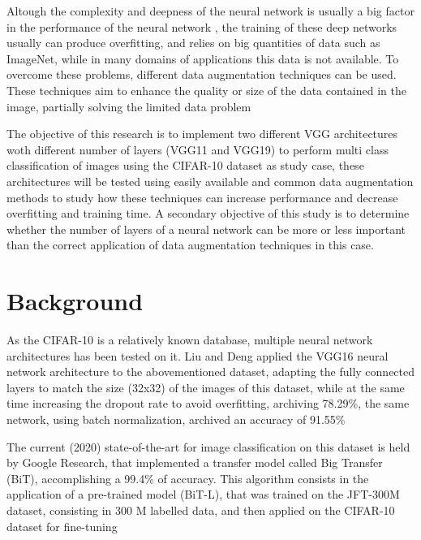 \documentclass[10pt,twocolumn,letterpaper]{article}
\begin{document}
Altough the complexity and deepness of the neural network is usually a big factor in the performance of the neural network \cite{He2016}, the training of these deep networks usually can produce overfitting, and relies on big quantities of data such as ImageNet, while in many domains of applications this data is not available. To overcome these problems, different data augmentation techniques can be used. These techniques aim to enhance the quality or size of the data contained in the image, partially solving the limited data problem \cite{Shorten2019}

The objective of this research is to implement two different VGG architectures woth different number of layers (VGG11 and VGG19) to perform multi class classification of images using the CIFAR-10 dataset as study case, these architectures will be tested using easily available and common data augmentation methods to study how these techniques can increase performance and decrease overfitting and training time. A secondary objective of this study is to determine whether the number of layers of a neural network can be more or less important than the correct application of data augmentation techniques in this case.


\section{Background}

As the CIFAR-10 is a relatively known database, multiple neural network architectures has been tested on it. Liu and Deng \cite{Liu2016} applied the VGG16 neural network architecture to the abovementioned dataset, adapting the fully connected layers to match the size (32x32) of the images of this dataset, while at the same time increasing the dropout rate to avoid overfitting, archiving 78.29\%, the same network, using batch normalization, archived an accuracy of 91.55\%

The current (2020) state-of-the-art for image classification on this dataset is held by Google Research, that implemented a transfer model called Big Transfer (BiT), accomplishing a 99.4\% of accuracy. This algorithm consists in the application of a pre-trained model (BiT-L), that was trained on the JFT-300M dataset, consisting in 300 M labelled data, and then applied on the CIFAR-10 dataset for fine-tuning \cite{Kolesnikov2019}
\end{document}
